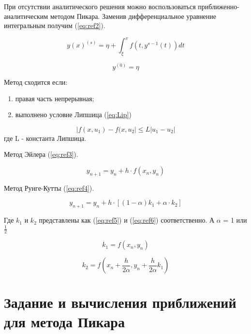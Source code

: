 При отсутствии аналитического решения можно воспользоваться приближенно-аналитическим методом Пикара.
Заменив дифференциальное уравнение интегральным получим (\ref{eq:ref2}).

\begin{equation}
	y(x)^{(s)} = \eta + \int_{\xi}^{x} f(t, y^{s-1}(t)) dt
	\label{eq:ref2}
\end{equation}

\begin{equation}
	y^{(0)} = \eta
\end{equation}

Метод сходится если:

\begin{enumerate}
	\item правая часть непрерывная;
	\item выполнено условие Липшица (\ref{eq:Lip})
\end{enumerate}

\begin{equation}
	|f(x, u_1) - f(x, u_2| \leq L |u_1-u_2|
	\label{eq:Lip}
\end{equation}
где L - константа Липшица.

Метод Эйлера (\ref{eq:ref3}).

\begin{equation}
	y_{n+1} = y_n + h\cdot f(x_n, y_n)
	\label{eq:ref3}
\end{equation}


Метод Рунге-Кутты (\ref{eq:ref4}).

\begin{equation}
	y_{n+1} = y_n + h\cdot[(1-\alpha)k_1 + \alpha \cdot k_2]
	\label{eq:ref4}
\end{equation}

Где $k_1$ и $k_2$ представлены как (\ref{eq:ref5}) и (\ref{eq:ref6}) соответственно. А $\alpha$ = 1 или $\frac{1}{2}$

\begin{equation}
	k_1 = f(x_n, y_n)
	\label{eq:ref5}
\end{equation}

\begin{equation}
	k_2 = f(x_n + \frac{h}{2\alpha}, y_n + \frac{h}{2\alpha}k_1)
	\label{eq:ref6}
\end{equation}

\chapter{Задание и вычисления приближений для метода Пикара}

